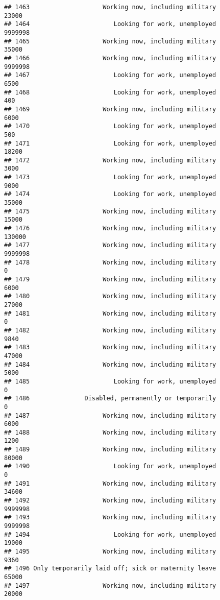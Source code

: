 \documentclass[]{book}
\theoremstyle{definition}
\theoremstyle{definition}
\theoremstyle{remark}
\begin{document}
\begin{verbatim}
## 1463                    Working now, including military           23000
## 1464                       Looking for work, unemployed         9999998
## 1465                    Working now, including military           35000
## 1466                    Working now, including military         9999998
## 1467                       Looking for work, unemployed            6500
## 1468                       Looking for work, unemployed             400
## 1469                    Working now, including military            6000
## 1470                       Looking for work, unemployed             500
## 1471                       Looking for work, unemployed           18200
## 1472                    Working now, including military            3000
## 1473                       Looking for work, unemployed            9000
## 1474                       Looking for work, unemployed           35000
## 1475                    Working now, including military           15000
## 1476                    Working now, including military          130000
## 1477                    Working now, including military         9999998
## 1478                    Working now, including military               0
## 1479                    Working now, including military            6000
## 1480                    Working now, including military           27000
## 1481                    Working now, including military               0
## 1482                    Working now, including military            9840
## 1483                    Working now, including military           47000
## 1484                    Working now, including military            5000
## 1485                       Looking for work, unemployed               0
## 1486               Disabled, permanently or temporarily               0
## 1487                    Working now, including military            6000
## 1488                    Working now, including military            1200
## 1489                    Working now, including military           80000
## 1490                       Looking for work, unemployed               0
## 1491                    Working now, including military           34600
## 1492                    Working now, including military         9999998
## 1493                    Working now, including military         9999998
## 1494                       Looking for work, unemployed           19000
## 1495                    Working now, including military            9360
## 1496 Only temporarily laid off; sick or maternity leave           65000
## 1497                    Working now, including military           20000

\end{verbatim}
\end{document}
